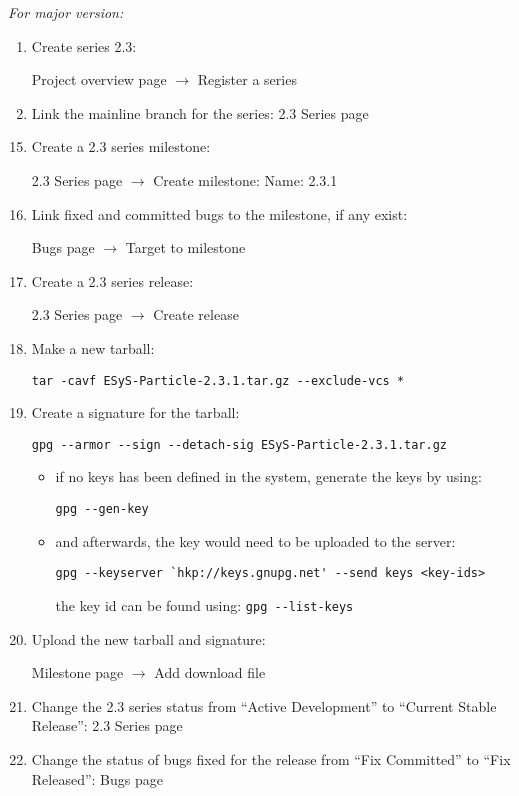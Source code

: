 \textit{For major version:}
\begin{enumerate} \parskip0pt 
    \itshape
    \setcounter{enumi}{12}
    \item Create series 2.3:

    Project overview page $\rightarrow$ Register a series
    \item Link the mainline branch for the series: 2.3 Series page
\end{enumerate}

\begin{enumerate}
    \setcounter{enumi}{14}
    \item Create a 2.3 series milestone:

    2.3 Series page $\rightarrow$ Create milestone: Name: 2.3.1
    \item Link fixed and committed bugs to the milestone, if any exist:

    Bugs page $\rightarrow$ Target to milestone
    \item Create a 2.3 series release:

    2.3 Series page $\rightarrow$ Create release
    \item Make a new tarball:

    \lstinline{tar -cavf ESyS-Particle-2.3.1.tar.gz --exclude-vcs *}
    \item Create a signature for the tarball:

    \lstinline{gpg --armor --sign --detach-sig ESyS-Particle-2.3.1.tar.gz}
    \begin{itemize}
    \item if no keys has been defined in the system, generate the keys by using:

    \lstinline{gpg --gen-key}
    \item and afterwards, the key would need to be uploaded to the server:

    \lstinline{gpg --keyserver `hkp://keys.gnupg.net' --send keys <key-ids>} 

        the key id can be found using: \lstinline{gpg --list-keys}
    \end{itemize}

    \item Upload the new tarball and signature:

    Milestone page $\rightarrow$ Add download file
    \item Change the 2.3 series status from ``Active Development'' to ``Current Stable Release'': 2.3 Series page
    \item Change the status of bugs fixed for the release from ``Fix Committed'' to ``Fix Released'': Bugs page
\end{enumerate}
